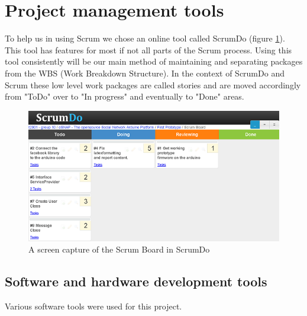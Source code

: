 \section{Project management tools}

To help us in using Scrum we chose an online tool called ScrumDo (figure \ref{fig:mgmt-scrumdo}).
This tool has features for most if not all parts of the Scrum process. Using this tool
consistently will be our main method of maintaining and separating packages from
the WBS (Work Breakdown Structure). In the context of ScrumDo and
Scrum these low level work packages are called stories and are moved
accordingly from "ToDo" over to "In progress"
and eventually to "Done" areas.

\begin{figure}[h!]
\centering \includegraphics{img/mgmt-scrumdo} \caption{A screen capture of the Scrum Board in ScrumDo \cite{link:scrumdo}}
\label{fig:mgmt-scrumdo}
\end{figure}

\subsection{Software and hardware development tools}
Various software tools were used for this project.

